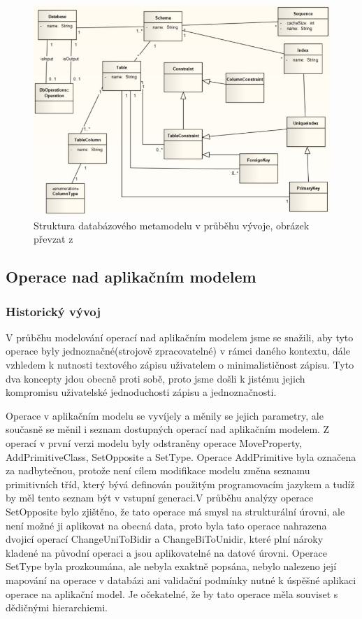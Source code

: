 \documentclass[11pt,twoside,a4paper]{book}
\begin{document}
\begin{figure}[ht]
\begin{center}
\includegraphics[width=15cm]{figures/rdb_structure_lukes}
\caption{Struktura databázového metamodelu v průběhu vývoje, obrázek převzat z
\cite{Lukes}}
\label{fig:rdb_str_lukes}
\end{center}
\end{figure}


\subsection{Operace nad aplikačním modelem}


\subsubsection{Historický vývoj}

V průběhu modelování operací nad aplikačním modelem jsme se snažili, aby tyto
operace byly jednoznačné(strojově zpracovatelné) v rámci daného kontextu, dále
vzhledem k nutnosti textového zápisu uživatelem o minimalističnost zápisu. Tyto
dva koncepty jdou obecně proti sobě, proto jsme došli k jistému jejich
kompromisu uživatelské jednoduchosti zápisu a jednoznačnosti.

Operace v aplikačním modelu se vyvíjely a měnily se jejich parametry, ale
současně se měnil i seznam dostupných operací nad aplikačním modelem. Z operací
v první verzi modelu byly odstraněny operace MoveProperty, AddPrimitiveClass,
SetOpposite a SetType. Operace AddPrimitive byla označena za nadbytečnou,
protože není cílem modifikace modelu změna seznamu primitivních tříd, který
bývá definován použitým programovacím jazykem a tudíž by měl tento seznam být v
vstupní generaci.V průběhu analýzy operace SetOpposite bylo zjištěno, že tato
operace má smysl na strukturální úrovni, ale není možné ji aplikovat na obecná
data, proto byla tato operace nahrazena dvojicí operací ChangeUniToBidir a
ChangeBiToUnidir, které plní nároky kladené na původní operaci a jsou
aplikovatelné  na datové úrovni. Operace SetType byla prozkoumána, ale nebyla
exaktně popsána, nebylo nalezeno její mapování na operace v databázi ani
validační podmínky nutné k úspěšné aplikaci operace na aplikační model. Je
očekatelné, že by tato operace měla souviset s dědičnými hierarchiemi. 
\end{document}
